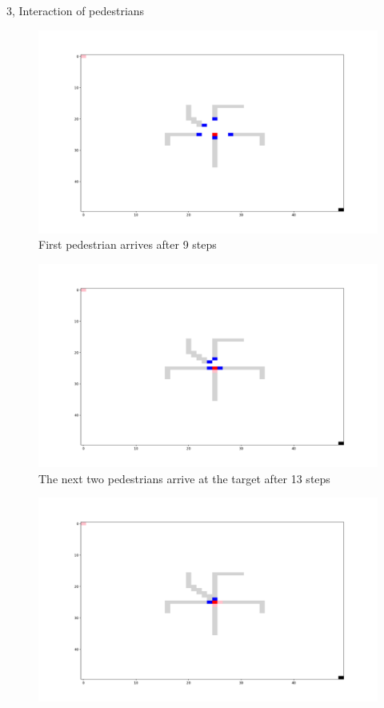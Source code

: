 \documentclass[10pt,a4paper]{article}
\begin{document}
\begin{task}{3, Interaction of pedestrians}
\begin{figure}
    \centering
    \includegraphics[width=\textwidth]{pictures/Figure_11.png}
    \caption{First pedestrian arrives after 9 steps}
    \label{fig:3_11}
\end{figure}
\begin{figure}
    \centering
    \includegraphics[width=\textwidth]{pictures/Figure_13.png}
    \caption{The next two pedestrians arrive at the target after 13 steps}
    \label{fig:3_13}
\end{figure}
\begin{figure}
    \centering
    \includegraphics[width=\textwidth]{pictures/Figure_15.png}

\end{figure}
\end{task}
\end{document}

